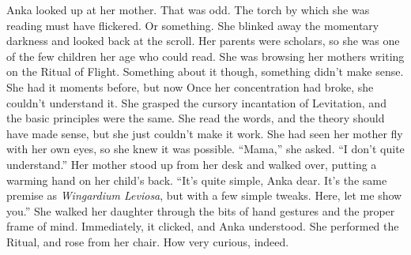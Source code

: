 \simpleline
\pagebreak
{}

Anka looked up at her mother. That was odd. The torch by which she was reading must have flickered. Or something. She blinked away the momentary darkness and looked back at the scroll. Her parents were scholars, so she was one of the few children her age who could read. She was browsing her mothers writing on the Ritual of Flight. Something about it though, something didn’t make sense. She had it moments before, but now{\el} Once her concentration had broke, she couldn’t understand it.
\SmallVSpace
She grasped the cursory incantation of Levitation, and the basic principles were the same. She read the words, and the theory should have made sense, but she just couldn’t make it work. She had seen her mother fly with her own eyes, so she knew it was possible.
\SmallVSpace
“Mama,” she asked. “I don’t quite understand.”
\SmallVSpace
Her mother stood up from her desk and walked over, putting a warming hand on her child’s back. “It’s quite simple, Anka dear. It’s the same premise as \emph{Wingardium Leviosa}, but with a few simple tweaks. Here, let me show you.”
\SmallVSpace
She walked her daughter through the bits of hand gestures and the proper frame of mind. Immediately, it clicked, and Anka understood. She performed the Ritual, and rose from her chair.
\SomeVSpace
How very curious, indeed.
\simpleline
{}

